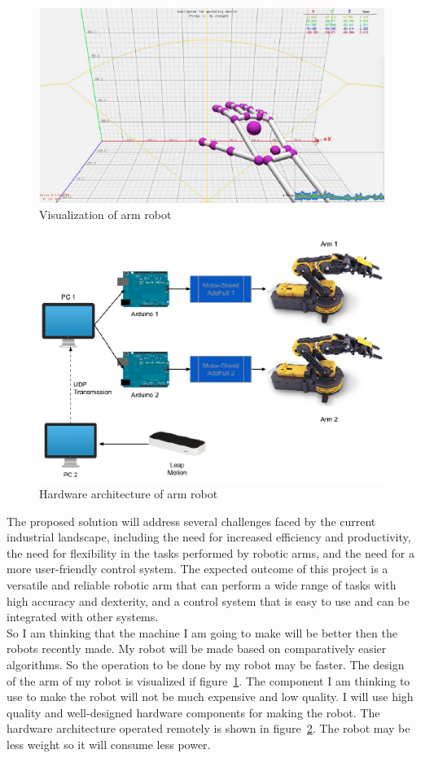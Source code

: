 \begin{figure}[h]
    \centering
    \includegraphics[width = .7\linewidth]{pic/1.png}
    \caption{Visualization of arm robot}
    \label{fig:fig1}
\end{figure}
\begin{figure}[h]
    \centering
    \includegraphics[width = .75\linewidth]{pic/5.png}
    \caption{Hardware architecture of arm robot}
    \label{fig:fig2}
\end{figure}
The proposed solution will address several challenges faced by the current industrial landscape, including the need for increased efficiency and productivity, the need for flexibility in the tasks performed by robotic arms, and the need for a more user-friendly control system. The expected outcome of this project is a versatile and reliable robotic arm that can perform a wide range of tasks with high accuracy and dexterity, and a control system that is easy to use and can be integrated with other systems.\\
So I am thinking that the machine I am going to make will be better then the robots recently made. My robot will be made based on comparatively easier algorithms. So the operation to be done by my robot may be faster. The design of the arm of my robot is visualized if figure~\ref{fig:fig1}. The component I am thinking to use to make the robot will not be much expensive and low quality. I will use high quality and well-designed hardware components for making the robot. The hardware architecture operated remotely is shown in figure~\ref{fig:fig2}. The robot may be less weight so it will consume less power.\\
